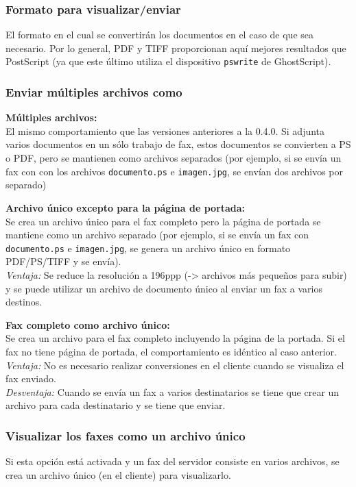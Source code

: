 \documentclass[a4paper,10pt]{scrartcl}
\begin{document}
\subsubsection{Formato para visualizar/enviar}

El formato en el cual se convertirán los documentos en el caso de que sea necesario. Por lo general, PDF y TIFF proporcionan aquí mejores resultados que PostScript (ya que este último utiliza el dispositivo \texttt{pswrite} de GhostScript).

\subsubsection{Enviar múltiples archivos como}

{\parindent0pt
\textbf{Múltiples archivos:}\\
El mismo comportamiento que las versiones anteriores a la 0.4.0. Si adjunta varios documentos en un sólo trabajo de fax, estos documentos se convierten a PS o PDF, pero se mantienen como archivos separados (por ejemplo, si se envía un fax con con los archivos \texttt{documento.ps} e \texttt{imagen.jpg}, se envían dos archivos por separado)
\medskip

\textbf{Archivo único excepto para la página de portada:}\\
Se crea un archivo único para el fax completo pero la página de portada se mantiene como un archivo separado (por ejemplo, si se envía un fax con \texttt{documento.ps} e \texttt{imagen.jpg}, se genera un archivo único en formato PDF/PS/TIFF y se envía).\\
\textit{Ventaja:} Se reduce la resolución a 196ppp (-> archivos más pequeños para subir) y se puede utilizar un archivo de documento único al enviar un fax a varios destinos.
\medskip

\textbf{Fax completo como archivo único:}\\
Se crea un archivo para el fax completo incluyendo la página de la portada. Si el fax no tiene página de portada, el comportamiento es idéntico al caso anterior.\\
\textit{Ventaja:} No es necesario realizar conversiones en el cliente cuando se visualiza el fax enviado.\\
\textit{Desventaja:} Cuando se envía un fax a varios destinatarios se tiene que crear un archivo para cada destinatario y se tiene que enviar.
}

\subsubsection{Visualizar los faxes como un archivo único}
Si esta opción está activada y un fax del servidor consiste en varios archivos, se crea un archivo único (en el cliente) para visualizarlo.
\end{document}
